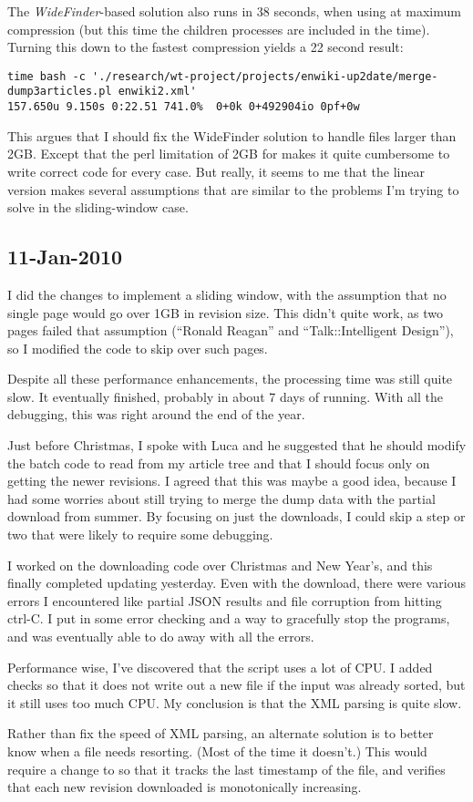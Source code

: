 The \textit{WideFinder}-based solution also runs in 38 seconds,
when using  at maximum compression (but this time
the children processes are included in the time).
Turning this down to the fastest compression yields a 22 second result:
\begin{verbatim}
time bash -c './research/wt-project/projects/enwiki-up2date/merge-dump3articles.pl enwiki2.xml'
157.650u 9.150s 0:22.51 741.0%  0+0k 0+492904io 0pf+0w
\end{verbatim}

This argues that I should fix the WideFinder solution to handle files larger than 2GB.
Except that the perl limitation of 2GB for  makes it
quite cumbersome to write correct code for every case.
But really, it seems to me that the linear version makes several assumptions
that are similar to the problems I'm trying to solve in the sliding-window case.

\subsection{11-Jan-2010}

I did the changes to implement a sliding window,
with the assumption that no single page would go over 1GB in revision size.
This didn't quite work, as two pages failed that assumption
(``Ronald Reagan'' and ``Talk::Intelligent Design''),
so I modified the code to skip over such pages.

Despite all these performance enhancements, the processing time
was still quite slow.
It eventually finished, probably in about 7 days of running.
With all the debugging, this was right around the end of the year.

Just before Christmas, I spoke with Luca and he suggested that
he should modify the batch code to read from my article tree
and that I should focus only on getting the newer revisions.
I agreed that this was maybe a good idea, because I had some worries
about still trying to merge the dump data with the partial download
from summer.
By focusing on just the downloads, I could skip a step or
two that were likely to require some debugging.

I worked on the downloading code over Christmas and New Year's,
and this finally completed updating yesterday.
Even with the download, there were various errors I encountered
like partial JSON results and file corruption from hitting ctrl-C.
I put in some error checking and a way to gracefully stop the
programs, and was eventually able to do away with all the errors.

Performance wise, I've discovered that the 
script uses a lot of CPU.
I added checks so that it does not write out a new file if
the input was already sorted, but it still uses too much CPU.
My conclusion is that the XML parsing is quite slow.

Rather than fix the speed of XML parsing, an alternate solution
is to better know when a file needs resorting.
(Most of the time it doesn't.)
This would require a change to 
so that it tracks the last timestamp of the file,
and verifies that each new revision downloaded is monotonically
increasing.

